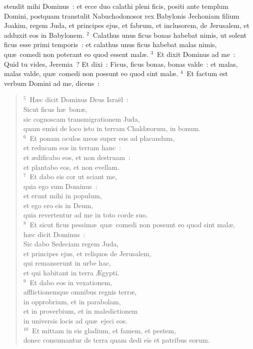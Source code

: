 \bchapter
{}stendit mihi Dominus~: et ecce duo calathi pleni ficis, positi ante templum Domini, postquam transtulit Nabuchodonosor rex Babylonis Jechoniam filium Joakim, regem Juda, et principes ejus, et fabrum, et inclusorem, de Jerusalem, et adduxit eos in Babylonem.
${}^{2}$~Calathus unus ficus bonas habebat nimis, ut solent ficus esse primi temporis~: et calathus unus ficus habebat malas nimis, qu\ae\ comedi non poterant eo quod essent mal\ae .
${}^{3}$~Et dixit Dominus ad me~: Quid tu vides, Jeremia~? Et dixi~: Ficus, ficus bonas, bonas valde~: et malas, malas valde, qu\ae\ comedi non possunt eo quod sint mal\ae .
${}^{4}$~Et factum est verbum Domini ad me, dicens~:
\begin{flushleft}\begin{verse}${}^{5}$~H\ae c dicit Dominus Deus Isra\"el~:\\ Sicut ficus h\ae\ bon\ae ,\\ sic cognoscam transmigrationem Juda,\\ quam emisi de loco isto in terram Chald\ae orum, in bonum.\\
${}^{6}$~Et ponam oculos meos super eos ad placandum,\\ et reducam eos in terram hanc~:\\ et \ae dificabo eos, et non destruam~:\\ et plantabo eos, et non evellam.\\
${}^{7}$~Et dabo eis cor ut sciant me,\\ quia ego sum Dominus~:\\ et erunt mihi in populum,\\ et ego ero eis in Deum,\\ quia revertentur ad me in toto corde suo.\\
${}^{8}$~Et sicut ficus pessim\ae\ qu\ae\ comedi non possunt eo quod sint mal\ae ,\\ h\ae c dicit Dominus~:\\ Sic dabo Sedeciam regem Juda,\\ et principes ejus, et reliquos de Jerusalem,\\ qui remanserunt in urbe hac,\\ et qui habitant in terra \AE gypti.\\
${}^{9}$~Et dabo eos in vexationem,\\ afflictionemque omnibus regnis terr\ae ,\\ in opprobrium, et in parabolam,\\ et in proverbium, et in maledictionem\\ in universis locis ad qu\ae\ ejeci eos.\\
${}^{10}$~Et mittam in eis gladium, et famem, et pestem,\\ donec consumantur de terra quam dedi eis et patribus eorum.\end{verse}\end{flushleft}




